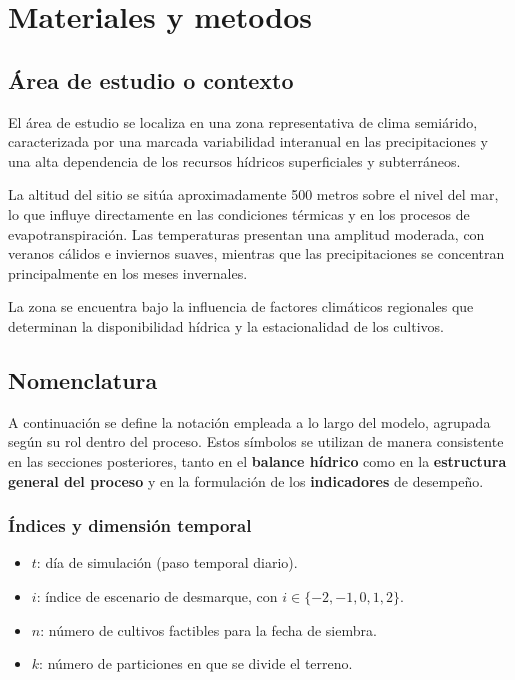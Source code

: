 \documentclass[12pt]{report}
\begin{document}
\chapter{Materiales y metodos}

\section{Área de estudio o contexto}

El área de estudio se localiza en una zona representativa de clima semiárido, caracterizada por una marcada variabilidad interanual en las precipitaciones y una alta dependencia de los recursos hídricos superficiales y subterráneos. 

La altitud del sitio se sitúa aproximadamente 500 metros sobre el nivel del mar, lo que influye directamente en las condiciones térmicas y en los procesos de evapotranspiración. Las temperaturas presentan una amplitud moderada, con veranos cálidos e inviernos suaves, mientras que las precipitaciones se concentran principalmente en los meses invernales.

La zona se encuentra bajo la influencia de factores climáticos regionales que determinan la disponibilidad hídrica y la estacionalidad de los cultivos. 

\section{Nomenclatura}

A continuación se define la notación empleada a lo largo del modelo, agrupada según su rol dentro del proceso. Estos símbolos se utilizan de manera consistente en las secciones posteriores, tanto en el \textbf{balance hídrico} como en la \textbf{estructura general del proceso} y en la formulación de los \textbf{indicadores} de desempeño.

\vspace{0.2cm}

\subsection*{Índices y dimensión temporal}

\begin{itemize}
    \item $t$: día de simulación (paso temporal diario).
    \item $i$: índice de escenario de desmarque, con $i \in \{-2,-1,0,1,2\}$.
    \item $n$: número de cultivos factibles para la fecha de siembra.
    \item $k$: número de particiones en que se divide el terreno.
\end{itemize}
\end{document}
